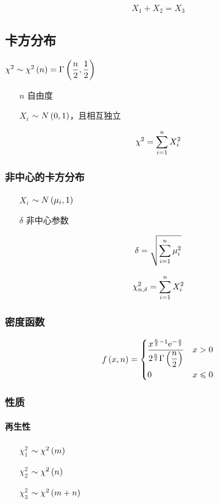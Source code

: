 \documentclass{article}
\begin{document}
\[X_1+X_2=X_3\]

\subsection{卡方分布}

$\chi^2\sim\chi^2\left(n\right)=\Gamma\left(\dfrac n2,\dfrac12\right)$

\begin{enumerate}
    \item [$n$] 自由度
    \item [$X_i$] $\sim N\left(0,1\right)$，且相互独立
\end{enumerate}

\[\chi^2=\sum_{i=1}^n X_i^2\]

\subsubsection{非中心的卡方分布}

\begin{enumerate}
    \item [$X_i$] $\sim N\left(\mu_i,1\right)$
    \item [$\delta$] 非中心参数
\end{enumerate}

\[\delta=\sqrt{\sum_{i=1}^n\mu_i^2}\]

\[\chi_{n,\delta}^2=\sum_{i=1}^n X_i^2\]

\subsubsection{密度函数}

\[f\left(x,n\right)=
    \left\{\begin{aligned}
         & \frac{x^{\frac n2-1}\mathrm e^{-\frac x2}}{2^{\frac n2}\Gamma\left(\dfrac n2\right)} &  & x>0         \\
         & 0                                                                    &  & x\leqslant0
    \end{aligned}\right.\]

\subsubsection{性质}

\paragraph{再生性}

\begin{enumerate}
    \item [$\chi_1^2$] $\sim\chi^2\left(m\right)$
    \item [$\chi_2^2$] $\sim\chi^2\left(n\right)$
    \item [$\chi_3^2$] $\sim\chi^2\left(m+n\right)$
\end{enumerate}
\end{document}
